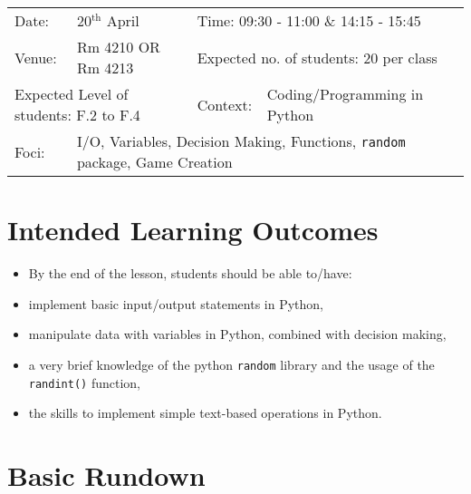 \documentclass{article}
\def\s{students }
\begin{document}
\begin{center}

\begin{tabular}{lllll}
Date: & 20$^{\text{th}}$ April & \multicolumn{3}{l}{Time: 09:30 - 11:00 \& 14:15 - 15:45} \\
Venue: & Rm 4210 OR Rm 4213 & \multicolumn{3}{l}{Expected no. of students: 20 per class} \\
\multicolumn{2}{l}{Expected Level of students: F.2 to F.4} & Context: & Coding/Programming in Python &\\
Foci: & \multicolumn{4}{l}{I/O, Variables, Decision Making, Functions, \texttt{random} package, Game Creation}\\
\end{tabular}
\end{center}

\section*{Intended Learning Outcomes}

\begin{itemize}
	\item[] By the end of the lesson, \s should be able to/have:
	\item implement basic input/output statements in Python,
	\item manipulate data with variables in Python, combined with decision making,
	\item a very brief knowledge of the python \texttt{random} library and the usage of the \texttt{randint()} function,
	\item the skills to implement simple text-based operations in Python.
\end{itemize}


\section*{Basic Rundown}
\end{document}
